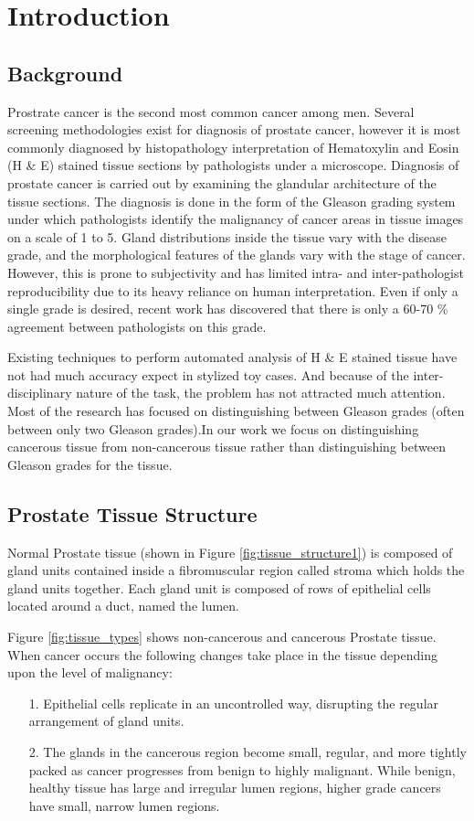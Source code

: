 \section{Introduction}
\label{sec:introduction}

\subsection{Background}
Prostrate cancer is the second most common cancer
among men. Several screening methodologies exist for diagnosis of prostate cancer, however it is most commonly diagnosed by histopathology interpretation of Hematoxylin and Eosin (H \& E) stained tissue sections by pathologists under a microscope. Diagnosis of prostate cancer is carried out by examining the glandular architecture of the tissue sections. The diagnosis is done in the form of the Gleason grading system \cite{gleason1966classification} under which pathologists identify the malignancy of cancer areas in tissue images on a scale of 1 to 5. Gland distributions inside the tissue vary with the disease grade, and the morphological features of the glands vary with the stage of cancer. However, this is prone to subjectivity and has limited intra- and inter-pathologist reproducibility due to its heavy reliance on human interpretation. Even if only a single grade is desired, recent work has discovered that there is only a 60-70 \% agreement between pathologists on this grade.


Existing techniques to perform automated analysis of H \& E stained tissue have not had much accuracy expect in stylized toy cases. And because of the inter-disciplinary nature of the task, the problem has not attracted much attention. Most of the research has focused on distinguishing between Gleason grades (often between only two Gleason grades).In our work we focus on distinguishing cancerous tissue from non-cancerous tissue rather than distinguishing between Gleason grades for the tissue.

\subsection{Prostate Tissue Structure}
Normal Prostate tissue (shown in Figure \ref{fig:tissue_structure1}) is composed of gland units contained inside a fibromuscular region called stroma which holds the gland units together. Each gland unit is composed of rows of epithelial cells located around a duct, named the lumen. 

Figure \ref{fig:tissue_types} shows non-cancerous and cancerous Prostate tissue. When cancer occurs the following changes take place in the tissue depending upon the level of malignancy:
\begin{enumerate}
\item[1.] Epithelial cells replicate in an uncontrolled way, disrupting the regular arrangement of gland units.
\item[2.] The glands in the cancerous region become small, regular, and more tightly packed as
cancer progresses from benign to highly malignant. While benign, healthy tissue has large and irregular lumen regions, higher grade cancers have small, narrow lumen regions.
\end{enumerate}


